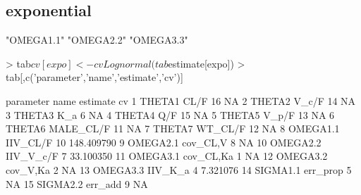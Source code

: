 \subsection{exponential}
\begin{Schunk}
\begin{Soutput}
[1] "OMEGA1.1" "OMEGA2.2" "OMEGA3.3"
\end{Soutput}
\begin{Sinput}
> tab$cv[expo] <- cvLognormal(tab$estimate[expo])
> tab[,c('parameter','name','estimate','cv')]
\end{Sinput}
\begin{Soutput}
   parameter      name estimate         cv
1     THETA1      CL/F       16         NA
2     THETA2     V_c/F       14         NA
3     THETA3       K_a        6         NA
4     THETA4       Q/F       15         NA
5     THETA5     V_p/F       13         NA
6     THETA6 MALE_CL/F       11         NA
7     THETA7   WT_CL/F       12         NA
8   OMEGA1.1  IIV_CL/F       10 148.409790
9   OMEGA2.1  cov_CL,V        8         NA
10  OMEGA2.2 IIV_V_c/F        7  33.100350
11  OMEGA3.1 cov_CL,Ka        1         NA
12  OMEGA3.2  cov_V,Ka        2         NA
13  OMEGA3.3   IIV_K_a        4   7.321076
14  SIGMA1.1  err_prop        5         NA
15  SIGMA2.2   err_add        9         NA
\end{Soutput}
\end{Schunk}
